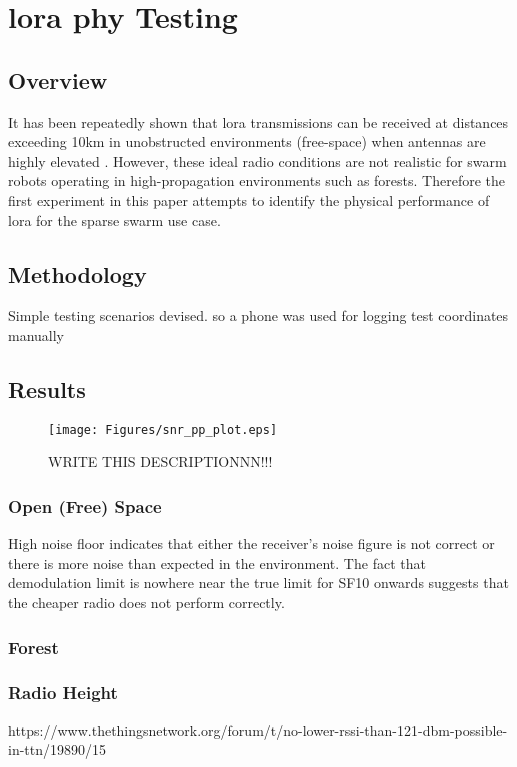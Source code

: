 \chapter{\ac{lora} \ac{phy} Testing}
\section{Overview}
It has been repeatedly shown that \ac{lora} transmissions can be received at distances exceeding 10km in  unobstructed environments (free-space) when antennas are highly elevated \cite{3YP:LORA_RANGE_REVIEW}. However, these ideal radio conditions are not realistic for swarm robots operating in high-propagation environments such as forests. Therefore the first experiment in this paper attempts to identify the physical performance of \ac{lora} for the sparse swarm use case. 



\section{Methodology}
Simple testing scenarios devised.
so a phone was used for logging test coordinates manually

\section{Results}
\the\textwidth
\begin{figure}[H]
    \centering
   	\texttt{[image: Figures/snr\_pp\_plot.eps]}
    \caption[\ac{snr} vs packet percentage plot]{
    WRITE THIS DESCRIPTIONNN!!!
    }
    \label{master_slave_sequence}
\end{figure}

\subsection{Open (Free) Space}
High noise floor indicates that either the receiver's noise figure is not correct or there is more noise than expected in the environment. The fact that demodulation limit is nowhere near the true limit for SF10 onwards suggests that the cheaper radio does not perform correctly.


\subsection{Forest}
\subsection{Radio Height}

https://www.thethingsnetwork.org/forum/t/no-lower-rssi-than-121-dbm-possible-in-ttn/19890/15